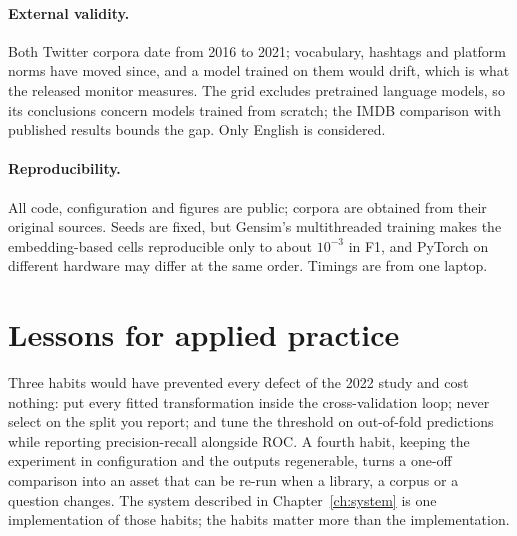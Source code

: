 \paragraph{External validity.} Both Twitter corpora date from 2016 to 2021; vocabulary, hashtags and platform norms have moved since, and a model trained on them would drift, which is what the released monitor measures. The grid excludes pretrained language models, so its conclusions concern models trained from scratch; the IMDB comparison with published results bounds the gap. Only English is considered.

\paragraph{Reproducibility.} All code, configuration and figures are public; corpora are obtained from their original sources. Seeds are fixed, but Gensim's multithreaded training makes the embedding-based cells reproducible only to about $10^{-3}$ in F1, and PyTorch on different hardware may differ at the same order. Timings are from one laptop.

\section{Lessons for applied practice}
Three habits would have prevented every defect of the 2022 study and cost nothing: put every fitted transformation inside the cross-validation loop; never select on the split you report; and tune the threshold on out-of-fold predictions while reporting precision-recall alongside ROC. A fourth habit, keeping the experiment in configuration and the outputs regenerable, turns a one-off comparison into an asset that can be re-run when a library, a corpus or a question changes. The system described in Chapter~\ref{ch:system} is one implementation of those habits; the habits matter more than the implementation.
